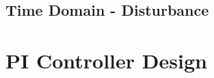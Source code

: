 \documentclass[11pt,titlepage]{article}
\begin{document}
    \subsection{Time Domain - Disturbance} \label{sub:dist}

\section{PI Controller Design}
\end{document}
